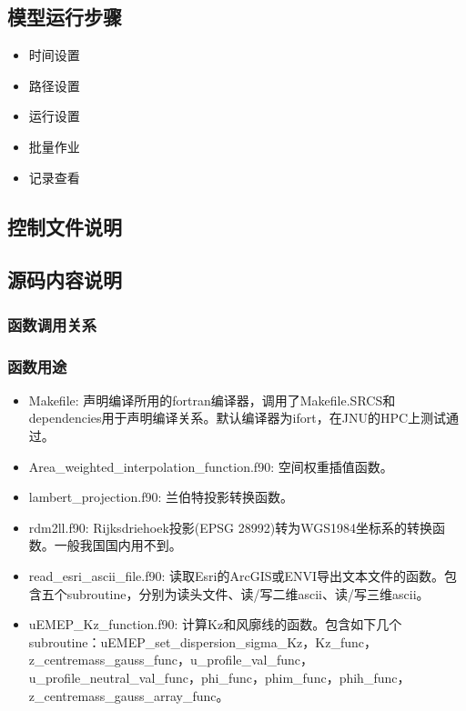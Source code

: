 \documentclass{article}
\begin{document}
\subsection{模型运行步骤}

\begin{itemize}

\item 时间设置

\item 路径设置

\item 运行设置

\item 批量作业

\item 记录查看

\end{itemize}

\subsection{控制文件说明}

\subsection{源码内容说明}

\subsubsection{函数调用关系}

\subsubsection{函数用途}

\begin{itemize}

\item Makefile:
声明编译所用的fortran编译器，调用了Makefile.SRCS和dependencies用于声明编译关系。默认编译器为ifort，在JNU的HPC上测试通过。

\item Area\_weighted\_interpolation\_function.f90:
空间权重插值函数。

\item lambert\_projection.f90:
兰伯特投影转换函数。

\item rdm2ll.f90:
Rijksdriehoek投影(EPSG 28992)转为WGS1984坐标系的转换函数。一般我国国内用不到。

\item read\_esri\_ascii\_file.f90:
读取Esri的ArcGIS或ENVI导出文本文件的函数。包含五个subroutine，分别为读头文件、读/写二维ascii、读/写三维ascii。

\item uEMEP\_Kz\_function.f90:
计算Kz和风廓线的函数。包含如下几个subroutine：uEMEP\_set\_dispersion\_sigma\_Kz，Kz\_func，z\_centremass\_gauss\_func，u\_profile\_val\_func，u\_profile\_neutral\_val\_func，phi\_func，phim\_func，phih\_func，z\_centremass\_gauss\_array\_func。

\end{itemize}
\end{document}
